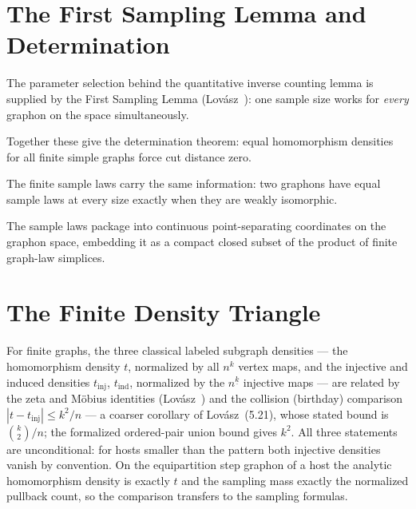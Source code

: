 
\section{The First Sampling Lemma and Determination}

The parameter selection behind the quantitative inverse counting lemma is supplied by
the First Sampling Lemma (Lov\'asz~\cite[Lemma~10.16]{lovasz2012}): one sample size
works for \emph{every} graphon on the space simultaneously.


Together these give the determination theorem: equal homomorphism densities for all
finite simple graphs force cut distance zero.


The finite sample laws carry the same information: two graphons have equal sample laws
at every size exactly when they are weakly isomorphic.


The sample laws package into continuous point-separating coordinates on the graphon
space, embedding it as a compact closed subset of the product of finite graph-law
simplices.


\section{The Finite Density Triangle}

For finite graphs, the three classical labeled subgraph densities --- the homomorphism density
$t$, normalized by all $n^k$ vertex maps, and the injective and induced densities
$t_{\mathrm{inj}}$, $t_{\mathrm{ind}}$, normalized by the $n^{\underline{k}}$ injective
maps --- are related by the zeta and M\"obius identities
(Lov\'asz~\cite[\S 5.2.3, (5.19)--(5.20)]{lovasz2012}) and the collision (birthday)
comparison $|t - t_{\mathrm{inj}}| \le k^2/n$ --- a coarser corollary of
Lov\'asz~(5.21), whose stated bound is $\binom{k}{2}/n$; the formalized ordered-pair union
bound gives $k^2$. All three statements are
unconditional: for hosts smaller than the pattern both injective densities vanish by
convention. On the equipartition step graphon of a host the analytic homomorphism density is
exactly $t$ and the sampling mass exactly the normalized pullback count, so the comparison
transfers to the sampling formulas.

